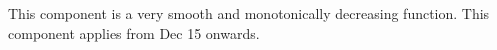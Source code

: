 This component is a very smooth and monotonically decreasing function.
This component applies from Dec   15 onwards.